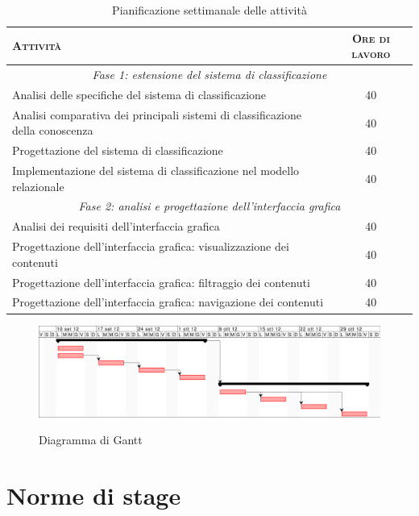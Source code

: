 \begin{table}[ht]
\centering
\begin{tabular}{|p{10cm}|c|}
\hline
\textsc{Attività} & \textsc{Ore di lavoro} \\ \hline
\multicolumn{2}{|c|}{\textit{Fase 1: estensione del sistema di classificazione}} \\ \hline 
Analisi delle specifiche del sistema di classificazione & 40 \\ \hline
Analisi comparativa dei principali sistemi di classificazione della conoscenza & 40 \\ \hline
Progettazione del sistema di classificazione & 40 \\ \hline
Implementazione del sistema di classificazione nel modello relazionale & 40 \\ \hline
\multicolumn{2}{|c|}{\textit{Fase 2: analisi e progettazione dell'interfaccia grafica}} \\ \hline 
Analisi dei requisiti dell'interfaccia grafica & 40 \\ \hline
Progettazione dell'interfaccia grafica: visualizzazione dei contenuti & 40 \\ \hline
Progettazione dell'interfaccia grafica: filtraggio dei contenuti & 40 \\ \hline
Progettazione dell'interfaccia grafica: navigazione dei contenuti & 40 \\ \hline
\end{tabular}
\caption{Pianificazione settimanale delle attività}
\label{tab:tesi:stage:pianificazione}
\end{table}

\begin{figure}[ht]
\begin{center}
\includegraphics[width=14.5cm]{gantt.png}
\label{fig:tesi:stage:gantt}
\caption{Diagramma di Gantt}
\end{center}
\end{figure}

\section{Norme di stage}

